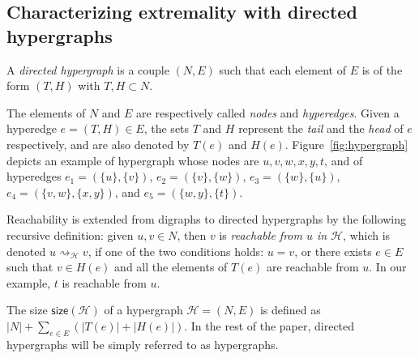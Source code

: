 \documentclass[proceedings]{stacs}
\newcommand{\HH}{\mathcal{H}}
\newcommand{\size}{\mathsf{size}}
\newcommand{\card}[1]{\left\lvert #1 \right\rvert}
\newcommand{\reachable}{\rightsquigarrow}
\begin{document}
\subsection{Characterizing extremality with directed hypergraphs}

A \emph{directed hypergraph} is a couple $(N,E)$ such that each element of $E$ is of the form $(T,H)$ with $T, H \subset N$. 

The elements of $N$ and $E$ are respectively called \emph{nodes} and \emph{hyperedges}. Given a hyperedge $e = (T,H) \in E$, the sets $T$ and $H$ represent the \emph{tail} and the \emph{head} of $e$ respectively, and are also denoted by $T(e)$ and $H(e)$. Figure~\ref{fig:hypergraph} depicts an example of hypergraph whose nodes are $u, v, w, x, y, t$, and of hyperedges $e_1 =(\{ u\}, \{v\})$, $e_2 = (\{ v\}, \{w\})$, $e_3 = (\{w\}, \{u\})$, $e_4 = (\{ v,w \}, \{x,y\})$, and $e_5 = (\{ w,y \}, \{t\})$.

Reachability is extended from digraphs to directed hypergraphs by the following recursive definition: given $u,v \in N$, then $v$ is \emph{reachable from $u$ in $\HH$}, which is denoted $u \reachable_\HH v$, if one of the two conditions holds:
$u = v$, 
or there exists $e \in E$ such that $v \in H(e)$ and all the elements of $T(e)$ are reachable from $u$.
In our example, $t$ is reachable from $u$.

The size $\size(\HH)$ of a hypergraph $\HH = (N,E)$ is defined as $\card{N} + \sum_{e \in E} (\card{T(e)} + \card{H(e)})$. In the rest of the paper, directed hypergraphs will be simply referred to as hypergraphs.
\end{document}
